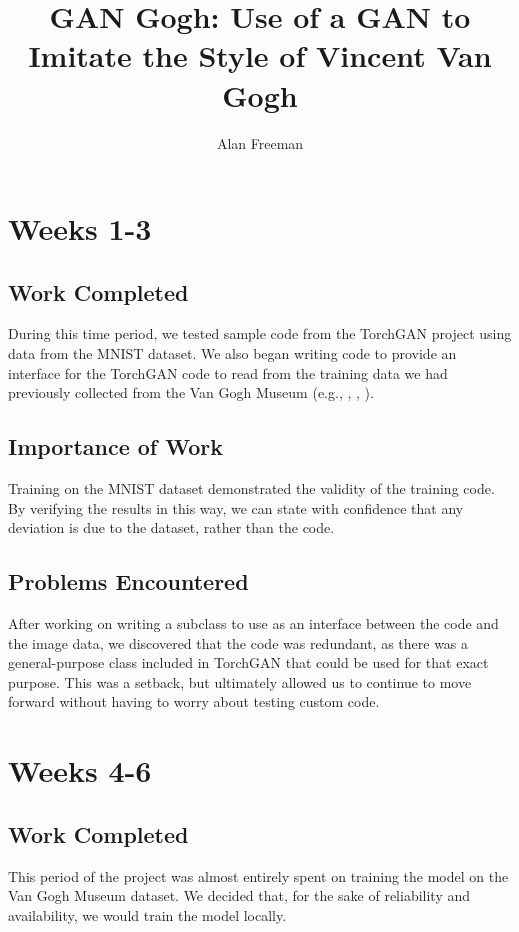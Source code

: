 \documentclass[12pt,letterpaper]{article}
\author{Alan Freeman}
\title{GAN Gogh: Use of a GAN to Imitate the Style of Vincent Van Gogh}
\begin{document}
	\maketitle
	
	
	\section{Weeks 1-3}
	\subsection{Work Completed}
	During this time period, we tested sample code from the TorchGAN\cite{pal2019torchgan} project                 using data from the MNIST\cite{lecun2010mnist} dataset.                     
	We also began writing code to provide an interface for the TorchGAN code to read from the training data we had previously collected from the Van Gogh Museum (e.g., \cite{001}, \cite{002}, \cite{003}).
	
	\subsection{Importance of Work}
	Training on the MNIST dataset demonstrated the validity of the training code. 
	By verifying the results in this way, we can state with confidence that any deviation is due to the dataset, rather than the code.
	
	\subsection{Problems Encountered}
	After working on writing a subclass to use as an interface between the code and the image data, we discovered that the code was redundant, as there was a general-purpose class included in TorchGAN that could be used for that exact purpose. This was a setback, but ultimately allowed us to continue to move forward without having to worry about testing custom code.

	\section{Weeks 4-6}
	\subsection{Work Completed}
	This period of the project was almost entirely spent on training the model on the Van Gogh Museum dataset. We decided that, for the sake of reliability and availability, we would train the model locally.
\end{document}
